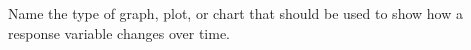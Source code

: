 \question[2]
Name the type of graph, plot, or chart that should be used to show how a response variable changes over time. 

